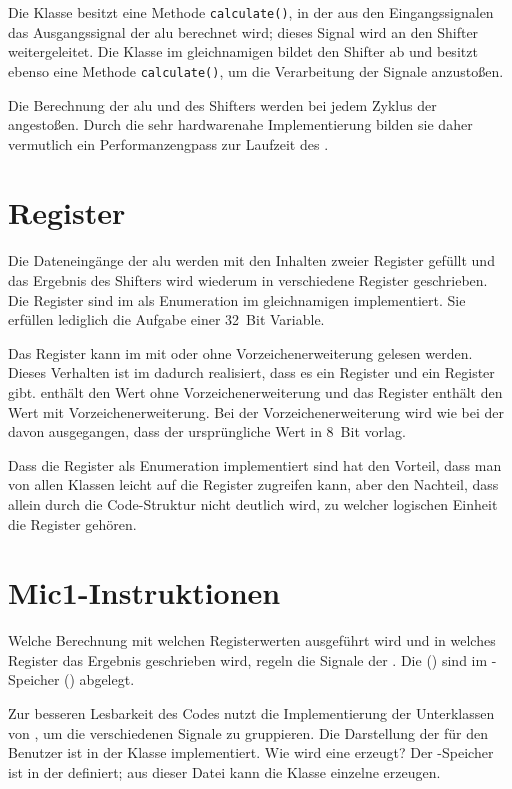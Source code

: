 Die Klasse besitzt eine Methode \texttt{calculate()}, in der aus den Eingangssignalen das Ausgangssignal der \gls{alu} berechnet wird; dieses Signal wird an den Shifter weitergeleitet. Die Klasse  im gleichnamigen \package bildet den Shifter ab und besitzt ebenso eine Methode \texttt{calculate()}, um die Verarbeitung der Signale anzustoßen.

Die Berechnung der \gls{alu} und des Shifters werden bei jedem Zyklus der \mic angestoßen. Durch die sehr hardwarenahe Implementierung bilden sie daher vermutlich ein Performanzengpass zur Laufzeit des \md.

\section{Register}
Die Dateneingänge der \gls{alu} werden mit den Inhalten zweier Register gefüllt und das Ergebnis des Shifters wird wiederum in verschiedene Register geschrieben. Die Register sind im \md als Enumeration  im gleichnamigen \package implementiert. Sie erfüllen lediglich die Aufgabe einer 32~Bit Variable.

Das Register  kann im \mic mit oder ohne Vorzeichenerweiterung gelesen werden. Dieses Verhalten ist im \md dadurch realisiert, dass es ein Register  und ein Register  gibt.  enthält den Wert ohne Vorzeichenerweiterung und das Register  enthält den Wert mit Vorzeichenerweiterung. Bei der Vorzeichenerweiterung wird wie bei der \mic davon ausgegangen, dass der ursprüngliche Wert in 8~Bit vorlag.

Dass die Register als Enumeration implementiert sind hat den Vorteil, dass man von allen Klassen leicht auf die Register zugreifen kann, aber den Nachteil, dass allein durch die Code-Struktur nicht deutlich wird, zu welcher logischen Einheit die Register gehören.

\section{Mic1-Instruktionen}
Welche Berechnung mit welchen Registerwerten ausgeführt wird und in welches Register das Ergebnis geschrieben wird, regeln die Signale der \mais. Die \mais () sind im \mac-Speicher () abgelegt.

Zur besseren Lesbarkeit des Codes nutzt die Implementierung der \mai Unterklassen von , um die verschiedenen Signale zu gruppieren. Die Darstellung der \mai für den Benutzer ist in der Klasse  implementiert. Wie wird eine \mai erzeugt? Der \mac-Speicher ist in der  definiert; aus dieser Datei kann die Klasse  einzelne \mais erzeugen.

